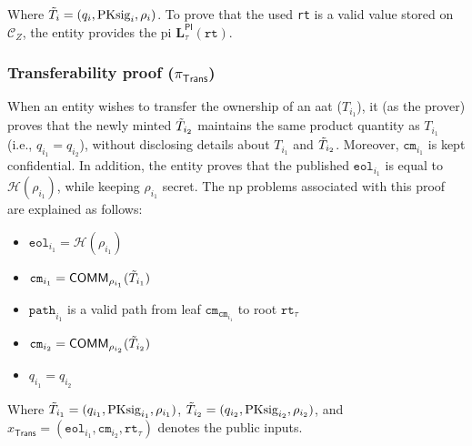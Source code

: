 Where $\Tilde{T}_i = (q_i, \text{PKsig}_i, \rho_i)$. To prove that the used \texttt{rt} is a valid value stored on $\mathcal{C}_Z$, the entity provides the \gls{pi} $\mathbf{L}_\tau^\mathsf{PI}(\texttt{rt})$.



\subsubsection{Transferability proof ($\pi_\textsf{Trans}$)}

When an entity wishes to transfer the ownership of an \gls{aat} ($T_{i_1}$), it (as the prover) proves that the newly minted $\Tilde{T}_{i_2}$ maintains the same product quantity as $T_{i_1}$ (i.e., $q_{i_1} = q_{i_2}$), without disclosing details about $T_{i_1}$ and $\Tilde{T}_{i_2}$. Moreover,  $\texttt{cm}_{i_1}$ is kept confidential. In addition, the entity proves that the published $\texttt{eol}_{i_1}$ is equal to $\mathcal{H}(\rho_{i_1})$, while keeping $\rho_{i_1}$ secret. The \gls{np} problems associated with this proof are explained as follows:

\begin{itemize}
	\item $\texttt{eol}_{i_1} = \mathcal{H}(\rho_{i_1} )$
	\item $\texttt{cm}_{i_1} = \mathsf{COMM}_{\rho_{i_1}}(\Tilde{T}_{i_1})$
	\item $\texttt{path}_{{i_1}}$ is a valid path from leaf  $\texttt{cm}_{\texttt{cm}_{i_1}}$ to root $\texttt{rt}_\tau$
	\item $\texttt{cm}_{i_2} = \mathsf{COMM}_{\rho_{i_2}}(\Tilde{T}_{i_2})$
	\item $q_{i_1} = q_{i_2} $
\end{itemize}
Where  $\Tilde{T}_{i_1} = (q_{i_1}, \text{PKsig}_{i_1}, \rho_{i_1})$, $\Tilde{T}_{i_2} = (q_{i_2}, \text{PKsig}_{i_2}, \rho_{i_2})$, and $x_\mathsf{Trans} = (\texttt{eol}_{i_1}, \texttt{cm}_{i_2}, \texttt{rt}_\tau)$ denotes the public inputs.

